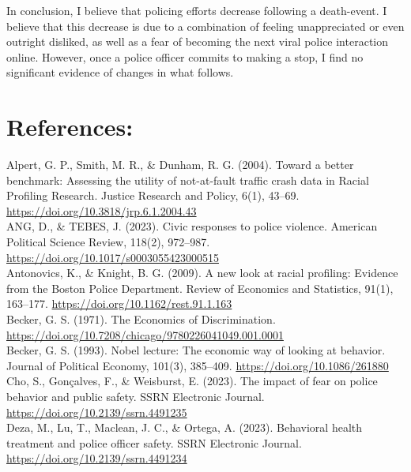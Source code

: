 \documentclass[12pt,a4paper]{article}
\begin{document}
In conclusion, I believe that policing efforts decrease following a death-event. I believe that this decrease is due to a combination of feeling unappreciated or even outright disliked, as well as a fear of becoming the next viral police interaction online. However, once a police officer commits to making a stop, I find no significant evidence of changes in what follows.  \\


\section{References:}

Alpert, G. P., Smith, M. R., \& Dunham, R. G. (2004). Toward a better benchmark: Assessing the utility of not-at-fault traffic crash data in Racial Profiling Research. Justice Research and Policy, 6(1), 43–69. \url{https://doi.org/10.3818/jrp.6.1.2004.43} \\

ANG, D., \& TEBES, J. (2023). Civic responses to police violence. American Political Science Review, 118(2), 972–987. \url{https://doi.org/10.1017/s0003055423000515} \\

Antonovics, K., \& Knight, B. G. (2009). A new look at racial profiling: Evidence from the Boston Police Department. Review of Economics and Statistics, 91(1), 163–177. \url{https://doi.org/10.1162/rest.91.1.163} \\

Becker, G. S. (1971). The Economics of Discrimination. \url{https://doi.org/10.7208/chicago/9780226041049.001.0001} \\

Becker, G. S. (1993). Nobel lecture: The economic way of looking at behavior. Journal of Political Economy, 101(3), 385–409. \url{https://doi.org/10.1086/261880} \\

Cho, S., Gonçalves, F., \& Weisburst, E. (2023). The impact of fear on police behavior and public safety. SSRN Electronic Journal. \url{https://doi.org/10.2139/ssrn.4491235} \\

Deza, M., Lu, T., Maclean, J. C., \& Ortega, A. (2023). Behavioral health treatment and police officer safety. SSRN Electronic Journal. \url{https://doi.org/10.2139/ssrn.4491234} \\
\end{document}

